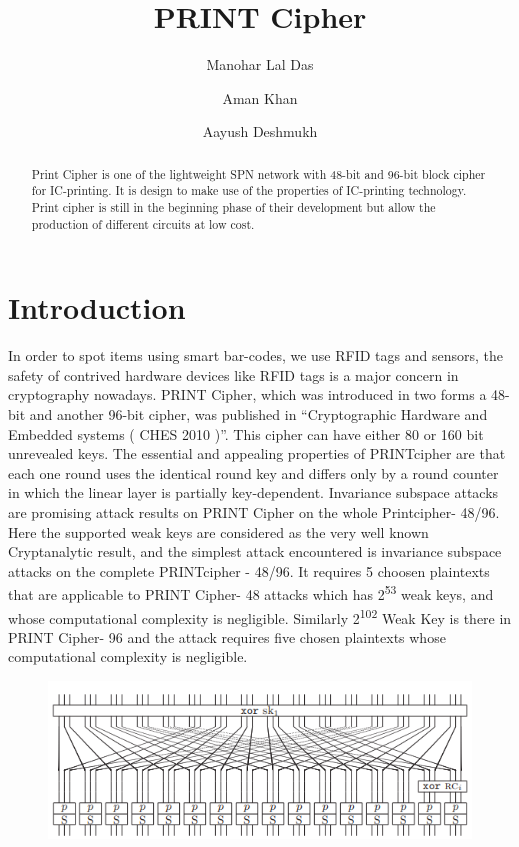 \documentclass[journal=tosc,preprint]{iacrtrans}
\author{Manohar Lal Das \and Aman Khan \and Aayush Deshmukh}
\institute{
  IIT Bhilai, Raipur, India, \email{manoharlal@iitbhilai.ac.in}
  \and
  IIT Bhilai, Raipur, India, \email{amankhan@iitbhilai.ac.in}
  \and
  IIT Bhilai, Raipur, India, \email{aayushd@iitbhilai.ac.in}
}
\title{PRINT Cipher}
\begin{document}
\maketitle




\begin{abstract}
  Print Cipher is one of the lightweight SPN network with 48-bit and 96-bit block cipher for IC-printing. It is design to make use of the properties of IC-printing technology. Print cipher is still in the beginning phase of their development but allow the production of different circuits at low cost.
\end{abstract}


\section{Introduction}

In order to spot items using smart bar-codes, we use RFID tags and sensors, the safety of contrived hardware devices like RFID tags is a major concern in cryptography nowadays. PRINT Cipher, which was introduced in two forms a 48-bit and another 96-bit cipher, was published in “Cryptographic Hardware and Embedded systems ( CHES 2010 )”. This cipher can have either 80 or 160 bit unrevealed keys. The essential and appealing properties of PRINTcipher are that each one round uses the identical round key and differs only by a round counter in which the linear layer is partially key-dependent. Invariance subspace attacks are promising attack results on PRINT Cipher on the whole Printcipher- 48/96. Here the supported weak keys are considered as the very well known Cryptanalytic result, and the simplest attack encountered is invariance subspace attacks on the complete PRINTcipher - 48/96.
It requires 5 choosen plaintexts that are applicable to PRINT Cipher- 48 attacks which has 2\textsuperscript{53} weak keys, and whose computational complexity is negligible. Similarly 2\textsuperscript{102} Weak Key is there in PRINT Cipher- 96 and the attack requires five chosen plaintexts whose computational complexity is negligible.

\begin{figure}[h]
	\includegraphics[width=\linewidth]{pics/printcipher.png}
\end{figure}
\end{document}
